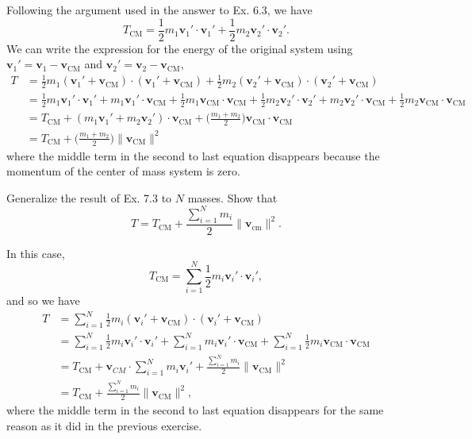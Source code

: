 \documentclass[../feynman-lectures-on-physics.tex]{subfiles}
\begin{document}
\begin{questions}
\begin{solution}
	Following the argument used in the answer to Ex. 6.3, we have
	\[
	T_{\text{CM}} = \frac{1}{2}m_1\mathbf{v}_1'\cdot\mathbf{v}_1' + \frac{1}{2}m_2\mathbf{v}_2'\cdot\mathbf{v}_2'
	.\] 
	We can write the expression for the energy of the original system using $\mathbf{v}_1' = \mathbf{v}_1 - \mathbf{v}_{\text{CM}}$ and $\mathbf{v}_2' = \mathbf{v}_2 - \mathbf{v}_{\text{CM}}$,
	\begin{align*}
		T &= \frac{1}{2}m_1(\mathbf{v}_1'+\mathbf{v}_{\text{CM}})\cdot(\mathbf{v}_1'+\mathbf{v}_{\text{CM}}) + \frac{1}{2}m_2(\mathbf{v}_2'+\mathbf{v}_{\text{CM}})\cdot(\mathbf{v}_2'+\mathbf{v}_{\text{CM}}) \\
		&= \frac{1}{2}m_1\mathbf{v}_1'\cdot\mathbf{v}_1' + m_1\mathbf{v}_1'\cdot\mathbf{v}_{\text{CM}} + \frac{1}{2}m_1\mathbf{v}_{\text{CM}}\cdot\mathbf{v}_{\text{CM}} + \frac{1}{2}m_2\mathbf{v}_2'\cdot\mathbf{v}_2' + m_2\mathbf{v}_2'\cdot\mathbf{v}_{\text{CM}} + \frac{1}{2}m_2\mathbf{v}_{\text{CM}}\cdot\mathbf{v}_{\text{CM}} \\
		&= T_{\text{CM}} + (m_1\mathbf{v}_1' + m_2\mathbf{v}_2')\cdot\mathbf{v}_{\text{CM}} + \Big(\frac{m_1+m_2}{2}\Big)\mathbf{v}_{\text{CM}}\cdot\mathbf{v}_{\text{CM}} \\
		&= T_{\text{CM}} + \Big(\frac{m_1+m_2}{2}\Big)\|\mathbf{v}_{\text{CM}}\|^2
	\end{align*}
	where the middle term in the second to last equation disappears because the momentum of the center of mass system is zero.
\end{solution}

\question Generalize the result of Ex. 7.3 to $N$ masses. Show that
\[
T = T_{\text{CM}} + \frac{\sum_{i=1}^Nm_i}{2}\|\mathbf{v}_{\text{cm}}\|^2
.\] 

\begin{solution}
	In this case,
	\[
	T_{\text{CM}} = \sum_{i=1}^N\frac{1}{2}m_i\mathbf{v}_i'\cdot\mathbf{v}_i'
	,\] 
	and so we have
	\begin{align*}
		T &= \sum_{i=1}^N\frac{1}{2}m_i(\mathbf{v}_i' + \mathbf{v}_{\text{CM}})\cdot(\mathbf{v}_i' + \mathbf{v}_{\text{CM}}) \\
		&= \sum_{i=1}^N\frac{1}{2}m_i\mathbf{v}_i'\cdot\mathbf{v}_i' + \sum_{i=1}^Nm_i\mathbf{v}_i'\cdot\mathbf{v}_{\text{CM}} + \sum_{i=1}^N\frac{1}{2}m_i\mathbf{v}_{\text{CM}}\cdot\mathbf{v}_{\text{CM}} \\
		&= T_{\text{CM}} + \mathbf{v}_{CM}\cdot\sum_{i=1}^Nm_i\mathbf{v}_i' + \frac{\sum_{i=1}^Nm_i}{2}\|\mathbf{v}_{\text{CM}}\|^2 \\
		&= T_{\text{CM}} + \frac{\sum_{i=1}^Nm_i}{2}\|\mathbf{v}_{\text{CM}}\|^2, 
	\end{align*}
	where the middle term in the second to last equation disappears for the same reason as it did in the previous exercise.
\end{solution}


\end{questions}
\end{document}
